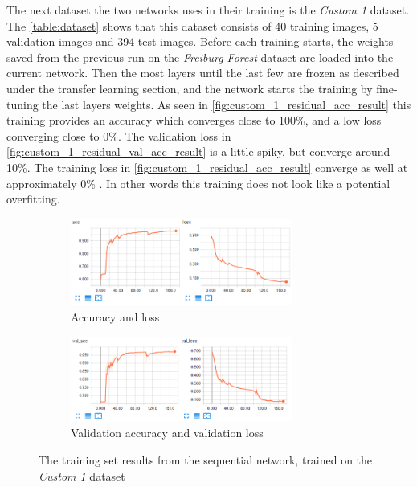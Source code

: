 \documentclass[USenglish]{ifimaster}  %
\begin{document}
The next dataset the two networks uses in their training is the \textit{Custom 1} dataset. The \cref{table:dataset} shows that this dataset consists of 40 training images, 5 validation images and 394 test images. Before each training starts, the weights saved from the previous run on the \textit{Freiburg Forest} dataset are loaded into the current network. Then the most layers until the last few are frozen as described under the transfer learning section, and the network starts the training by fine-tuning the last layers weights. As seen in \cref{fig:custom_1_residual_acc_result} this training provides an accuracy which converges close to 100\%, and a low loss converging close to 0\%. The validation loss in \cref{fig:custom_1_residual_val_acc_result} is a little spiky, but converge around 10\%. The training loss in \cref{fig:custom_1_residual_acc_result} converge as well at approximately 0\% . In other words this training does not look like a potential overfitting. 

\begin{figure}[H]
\centering
\begin{subfigure}[b]{\textwidth}
\centering
\includegraphics[width=0.8\textwidth]{bilder/custom_1_training/Custom_1_sequential_acc_training_results.png}
\caption{Accuracy and loss}
\label{fig:custom_1_sequential_acc_result}
\end{subfigure}
\hfill
\begin{subfigure}[b]{\textwidth}
\centering
\includegraphics[width=0.8\textwidth]{bilder/custom_1_training/Custom_1_sequential_val_acc_training_results.png}
\caption{Validation accuracy and validation loss}
\label{fig:custom_1_sequential_val_acc_result}
\end{subfigure}
\caption{The training set results from the sequential network, trained on the \textit{Custom 1} dataset}
\label{fig:custom_1_sequential_result}
\end{figure}
\end{document}
